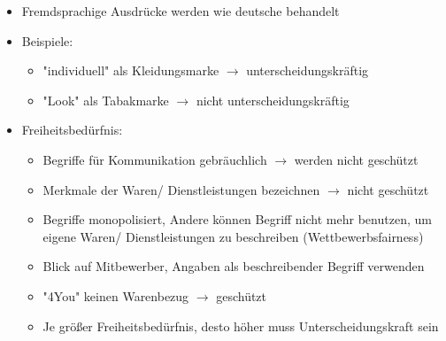 \documentclass{report}
\begin{document}
\begin{itemize}
\begin{itemize}
\begin{itemize}
			\item Fremdsprachige Ausdrücke werden wie deutsche behandelt
			\item Beispiele:
			\begin{itemize}
				\item "individuell" als Kleidungsmarke $\rightarrow$ unterscheidungskräftig
				\item "Look" als Tabakmarke $\rightarrow$ nicht unterscheidungskräftig
			\end{itemize}
			\item Freiheitsbedürfnis:
			\begin{itemize}
				\item Begriffe für Kommunikation gebräuchlich $\rightarrow$ werden nicht geschützt
				\item Merkmale der Waren/ Dienstleistungen bezeichnen $\rightarrow$ nicht geschützt
				\item Begriffe monopolisiert, Andere können Begriff nicht mehr benutzen, um eigene Waren/ Dienstleistungen zu beschreiben (Wettbewerbsfairness)
				\item Blick auf Mitbewerber, Angaben als beschreibender Begriff verwenden
				\item "4You" keinen Warenbezug $\rightarrow$ geschützt
				\item Je größer Freiheitsbedürfnis, desto höher muss Unterscheidungskraft sein
			\end{itemize}
		\end{itemize}
	\end{itemize}
\end{itemize}
\end{document}
